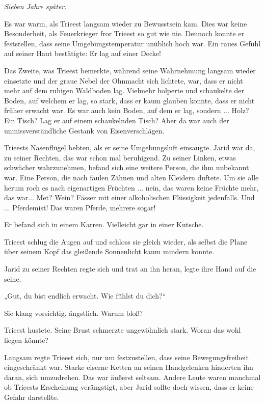 
\textit{Sieben Jahre später.}\bigskip




Es war warm, als Trieest langsam wieder zu Bewusstsein kam. Dies war keine Besonderheit, als Feuerkrieger fror Trieest so gut wie nie. Dennoch konnte er feststellen, dass seine Umgebungstemperatur unüblich hoch war. Ein raues Gefühl auf seiner Haut bestätigte: Er lag auf einer Decke!

Das Zweite, was Trieest bemerkte, während seine Wahrnehmung langsam wieder einsetzte und der graue Nebel der Ohnmacht sich lichtete, war, dass er nicht mehr auf dem ruhigen Waldboden lag. Vielmehr holperte und schaukelte der Boden, auf welchem er lag, so stark, dass er kaum glauben konnte, dass er nicht früher erwacht war. Es war auch kein Boden, auf dem er lag, sondern ... Holz? Ein Tisch? Lag er auf einem schaukelnden Tisch? Aber da war auch der unmissverständliche Gestank von Eisenverschlägen.

Trieests Nasenflügel bebten, als er seine Umgebungsluft einsaugte. Jarid war da, zu seiner Rechten, das war schon mal beruhigend. Zu seiner Linken, etwas schwächer wahrzunehmen, befand sich eine weitere Person, die ihm unbekannt war. Eine Person, die nach faulen Zähnen und alten Kleidern duftete. Um sie alle herum roch es nach eigenartigen Früchten ... nein, das waren keine Früchte mehr, das war... Met? Wein? Fässer mit einer alkoholischen Flüssigkeit jedenfalls. Und ... Pferdemist! Das waren Pferde, mehrere sogar!

Er befand sich in einem Karren. Vielleicht gar in einer Kutsche.

Trieest schlug die Augen auf und schloss sie gleich wieder, als selbst die Plane über seinem Kopf das gleißende Sonnenlicht kaum mindern konnte.

Jarid zu seiner Rechten regte sich und trat an ihn heran, legte ihre Hand auf die seine.

„Gut, du bist endlich erwacht. Wie fühlst du dich?“

Sie klang vorsichtig, ängstlich. Warum bloß?

Trieest hustete. Seine Brust schmerzte ungewöhnlich stark. Woran das wohl liegen könnte?

Langsam regte Trieest sich, nur um festzustellen, dass seine Bewegungsfreiheit eingeschränkt war. Starke eiserne Ketten an seinen Handgelenken hinderten ihn daran, sich umzudrehen. Das war äußerst seltsam. Andere Leute waren manchmal ob Trieests Erscheinung verängstigt, aber Jarid sollte doch wissen, dass er keine Gefahr darstellte.


